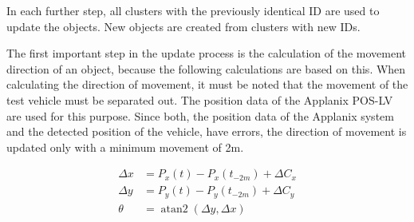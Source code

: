 \documentclass[11pt,oneside,openright]{mpreport}
\DeclareMathOperator{\atantwo}{atan2}
\begin{document}



In each further step, all clusters with the previously identical ID are used to update the objects. New objects are created from clusters with new IDs.

The first important step in the update process is the calculation of the movement direction of an object, because the following calculations are based on this.
When calculating the direction of movement, it must be noted that the movement of the test vehicle must be separated out. The position data of the Applanix POS-LV are used for this purpose.
Since both, the position data of the Applanix system and the detected position of the vehicle, have errors, the direction of movement is updated only with a minimum movement of 2m.

\begin{align*}
\Delta x &= P_x(t) - P_x(t_{-2m}) + \Delta C_x\\
\Delta y &= P_y(t) - P_y(t_{-2m}) + \Delta C_y\\
\theta &= \atantwo(\Delta y,\Delta x)
\end{align*}
\end{document}
